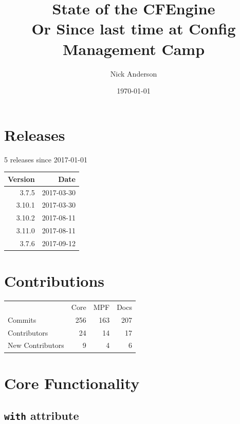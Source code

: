 \documentclass[11pt]{article}
\author{Nick Anderson}
\date{\today}
\title{State of the CFEngine\\\medskip
\large Or Since last time at Config Management Camp}
\begin{document}
\maketitle

\section*{}
\label{sec:org3e38e4b}

\section*{Releases}
\label{sec:org93816a3}
5 releases since 2017-01-01


\begin{center}
\begin{tabular}{rr}
Version & Date\\
\hline
3.7.5 & 2017-03-30\\
3.10.1 & 2017-03-30\\
3.10.2 & 2017-08-11\\
3.11.0 & 2017-08-11\\
3.7.6 & 2017-09-12\\
\end{tabular}
\end{center}

\section*{Contributions}
\label{sec:org2e7d66b}
\begin{center}
\label{tab:org67eb355}
\begin{tabular}{lrrr}
 & Core & MPF & Docs\\
Commits & 256 & 163 & 207\\
Contributors & 24 & 14 & 17\\
New Contributors & 9 & 4 & 6\\
\end{tabular}
\end{center}

\section*{Core Functionality}
\label{sec:org4564deb}
\subsection*{\texttt{with} attribute}
\label{sec:orgb653bd2}
\end{document}

